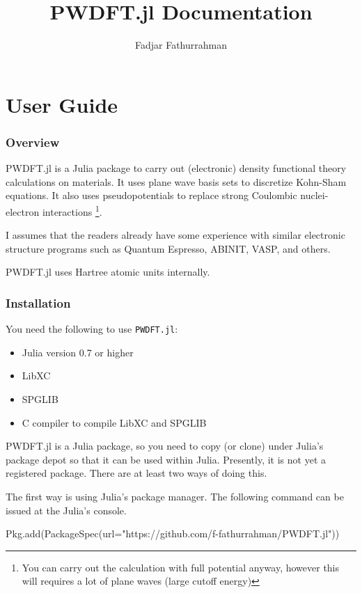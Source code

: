 \documentclass[a4paper,10pt,twocolumn]{paper}
\begin{document}
\title{\textsf{PWDFT.jl} Documentation}
\author{Fadjar Fathurrahman}
\maketitle

\tableofcontents

\part{User Guide}

\section{Overview}

\textsf{PWDFT.jl} is a Julia package to carry out (electronic)
density functional theory calculations on materials.
It uses plane wave basis sets to discretize Kohn-Sham equations.
It also uses pseudopotentials to replace strong Coulombic nuclei-electron
interactions \footnote{You can carry out the calculation with
full potential anyway, however this will requires a lot of plane waves (large
cutoff energy)}.

I assumes that the readers already have some experience with similar electronic
structure programs such as Quantum Espresso, ABINIT, VASP, and others.

\textsf{PWDFT.jl} uses Hartree atomic units internally.

\section{Installation}

You need the following to use \texttt{PWDFT.jl}:
\begin{itemize}
\item Julia version 0.7 or higher
\item LibXC
\item SPGLIB
\item C compiler to compile LibXC and SPGLIB
\end{itemize}

\textsf{PWDFT.jl} is a Julia package, so you need to copy (or clone)
under Julia's package depot so that it can be used within Julia.
Presently, it is not yet a registered package. There are at least
two ways of doing this.

The first way is using Julia's package manager. The following command
can be issued at the Julia's console.
\begin{juliacode}
Pkg.add(PackageSpec(url="https://github.com/f-fathurrahman/PWDFT.jl"))
\end{juliacode}
\end{document}
